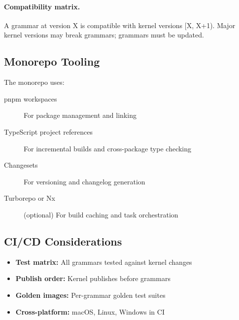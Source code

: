 \paragraph{Compatibility matrix.}
A grammar at version X is compatible with kernel versions [X, X+1). Major kernel versions may break grammars; grammars must be updated.

\subsection{Monorepo Tooling}

The monorepo uses:

\begin{description}
  \item[pnpm workspaces] For package management and linking
  \item[TypeScript project references] For incremental builds and cross-package type checking
  \item[Changesets] For versioning and changelog generation
  \item[Turborepo or Nx] (optional) For build caching and task orchestration
\end{description}

\subsection{CI/CD Considerations}

\begin{itemize}
  \item \textbf{Test matrix:} All grammars tested against kernel changes
  \item \textbf{Publish order:} Kernel publishes before grammars
  \item \textbf{Golden images:} Per-grammar golden test suites
  \item \textbf{Cross-platform:} macOS, Linux, Windows in CI
\end{itemize}
